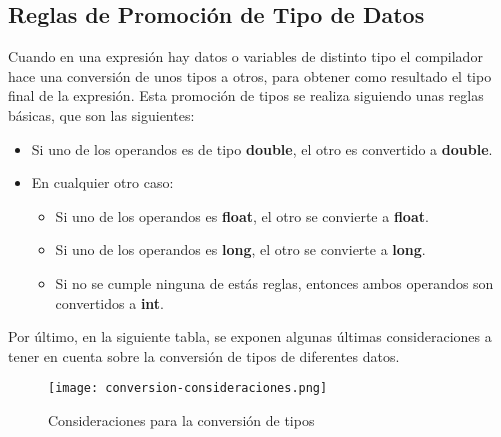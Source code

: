 \subsection*{Reglas de Promoción de Tipo de Datos}
Cuando en una expresión hay datos o variables de distinto tipo el compilador hace una conversión de unos tipos a otros, para obtener como resultado el tipo final de la expresión. Esta promoción de tipos se realiza siguiendo unas reglas básicas, que son las siguientes:

\begin{itemize}
    \item Si uno de los operandos es de tipo \textbf{double}, el otro es convertido a \textbf{double}.
    \item En cualquier otro caso:
    \begin{itemize}
        \item Si uno de los operandos es \textbf{float}, el otro se convierte a \textbf{float}.
        \item Si uno de los operandos es \textbf{long}, el otro se convierte a \textbf{long}.
        \item Si no se cumple ninguna de estás reglas, entonces ambos operandos son convertidos a \textbf{int}.
    \end{itemize}
\end{itemize}

Por último, en la siguiente tabla, se exponen algunas últimas consideraciones a tener en cuenta sobre la conversión de tipos de diferentes datos.

\begin{figure}[H]
    \centering
    \texttt{[image: conversion-consideraciones.png]}
    \caption{Consideraciones para la conversión de tipos}
\end{figure}






